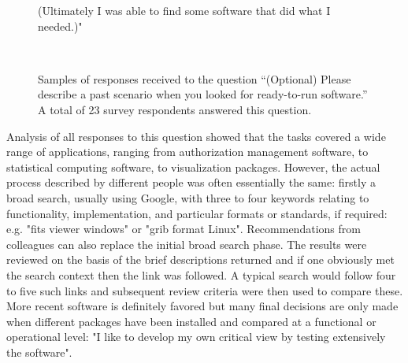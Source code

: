 \documentclass{casicswhitepaper}
\begin{document}
\begin{figure}[t]
{\begin{minipage}{5.75in}
(Ultimately I was able to find some software that did what I needed.)"  \end{minipage}}\\
  \vspace*{1.5ex}
  \caption{Samples of responses received to the question ``(Optional) Please describe a past scenario when you looked for ready-to-run software.''  A total of 23 survey respondents answered this question.}
  \label{sample-responses}
\end{figure}  

Analysis of all responses to this question showed that the tasks covered a wide range of applications, ranging from authorization management software, to statistical computing software, to visualization packages. However, the actual process described by different people was often essentially the same: firstly a broad search, usually using Google, with three to four keywords relating to functionality, implementation, and particular formats or standards, if required: e.g. "fits viewer windows" or "grib format Linux". Recommendations from colleagues can also replace the initial broad search phase. The results were reviewed on the basis of the brief descriptions returned and if one obviously met the search context then the link was followed. A typical search would follow four to five such links and subsequent review criteria were then used to compare these. More recent software is definitely favored but many final decisions are only made when different packages have been installed and compared at a functional or operational level: "I like to develop my own critical view by testing extensively the software".
\end{document}
